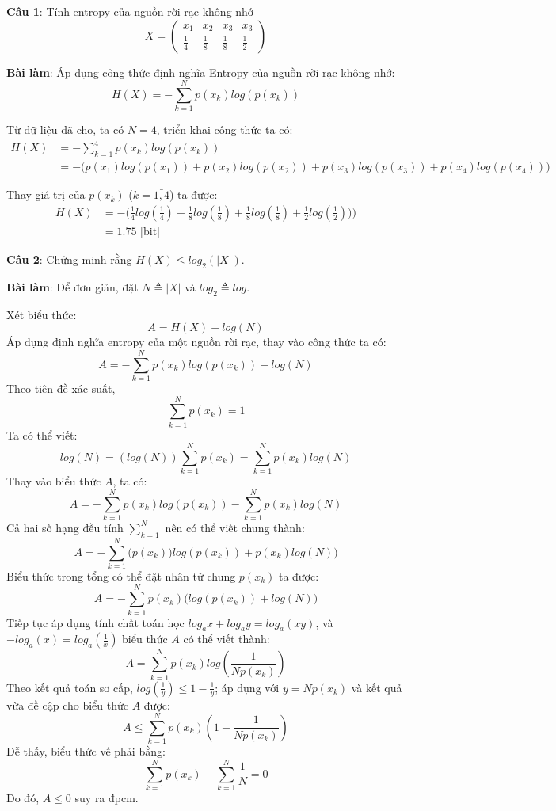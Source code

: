 \documentclass[12pt]{article}
\begin{document}

\textbf{Câu 1}: Tính entropy của nguồn rời rạc không nhớ
\begin{equation*}
    X = \begin{pmatrix}
        x_1 & x_2 & x_3 & x_3 \\
        \frac{1}{4} & \frac{1}{8} & \frac{1}{8} & \frac{1}{2}
    \end{pmatrix}
\end{equation*}

\textbf{Bài làm}: Áp dụng công thức định nghĩa Entropy của nguồn rời rạc không nhớ:
$$H(X)=-\sum_{k=1}^{N}p(x_k)log(p(x_k))$$

Từ dữ liệu đã cho, ta có $N=4$, triển khai công thức ta có:
\begin{align*}
    H(X) &= -\sum_{k=1}^{4}p(x_k)log(p(x_k))\\
    &= -\big(p(x_1)log(p(x_1))+p(x_2)log(p(x_2))+p(x_3)log(p(x_3))+p(x_4)log(p(x_4)) \big)
\end{align*}

Thay giá trị của $p(x_k)$ ($k=\bar{1,4}$) ta được:
\begin{align*}
    H(X) &= -\big(\frac{1}{4}log(\frac{1}{4})+\frac{1}{8}log(\frac{1}{8})+\frac{1}{8}log(\frac{1}{8})+\frac{1}{2}log(\frac{1}{2})) \big) \\
    &= 1.75 \text{ [bit] }
\end{align*}


\newpage
\textbf{Câu 2}: Chứng minh rằng $H(X)\le log_2(|X|)$.

\textbf{Bài làm}: Để đơn giản, đặt $N\triangleq |X|$ và $log_2\triangleq log$.

Xét biểu thức:
$$A = H(X)-log(N)$$
Áp dụng định nghĩa entropy của một nguồn rời rạc, thay vào công thức ta có:
$$A = -\sum_{k=1}^Np(x_k)log(p(x_k))-log(N)$$
Theo tiên đề xác suất,
$$\sum_{k=1}^Np(x_k)=1$$
Ta có thể viết:
$$log(N) = (log(N))\sum_{k=1}^Np(x_k)=\sum_{k=1}^Np(x_k)log(N)$$
Thay vào biểu thức $A$, ta có:
$$A = -\sum_{k=1}^Np(x_k)log(p(x_k))-\sum_{k=1}^Np(x_k)log(N)$$
Cả hai số hạng đều tính $\sum_{k=1}^N$ nên có thể viết chung thành:
$$A=-\sum_{k=1}^N\big(p(x_k))log(p(x_k))+p(x_k)log(N)\big)$$
Biểu thức trong tổng có thể đặt nhân tử chung $p(x_k)$ ta được:
$$A=-\sum_{k=1}^Np(x_k)\big(log(p(x_k))+log(N)\big)$$
Tiếp tục áp dụng tính chất toán học $log_ax+log_ay = log_a(xy)$, và $-log_a(x)=log_a(\frac{1}{x})$
biểu thức $A$ có thể viết thành:
$$A = \sum_{k=1}^Np(x_k)log(\frac{1}{Np(x_k)})$$
Theo kết quả toán sơ cấp, $log(\frac{1}{y})\le 1-\frac{1}{y}$; áp dụng với $y=Np(x_k)$ và kết quả vừa đề cập cho biểu thức $A$ được:
$$A\le \sum_{k=1}^Np(x_k)(1-\frac{1}{Np(x_k)})$$
Dễ thấy, biểu thức vế phải bằng:
$$\sum_{k=1}^Np(x_k)-\sum_{k=1}^N\frac{1}{N}=0$$
Do đó, $A\le 0$ suy ra đpcm.
\end{document}
